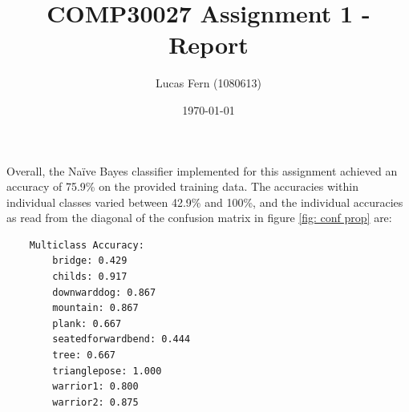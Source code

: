 \documentclass{article}
\title{COMP30027 Assignment 1 - Report}
\date{\today}
\author{Lucas Fern (1080613)}
\begin{document}
\maketitle
\noindent Overall, the Naïve Bayes classifier implemented for this assignment achieved an accuracy of 75.9\% on the provided training data. The accuracies within individual classes varied between 42.9\% and 100\%, and the individual accuracies as read from the diagonal of the confusion matrix in figure \ref{fig: conf prop} are:
\begin{verbatim}
    Multiclass Accuracy:
        bridge: 0.429
        childs: 0.917
        downwarddog: 0.867
        mountain: 0.867
        plank: 0.667
        seatedforwardbend: 0.444
        tree: 0.667
        trianglepose: 1.000
        warrior1: 0.800
        warrior2: 0.875
\end{verbatim}
\end{document}
